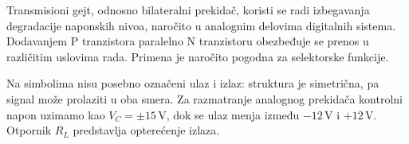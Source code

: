 Transmisioni gejt, odnosno bilateralni prekidač, koristi se radi izbegavanja degradacije naponskih nivoa, naročito u analognim delovima digitalnih sistema. Dodavanjem P tranzistora paralelno N tranzistoru obezbeđuje se prenos u različitim uslovima rada. Primena je naročito pogodna za selektorske funkcije.

Na simbolima nisu posebno označeni ulaz i izlaz: struktura je simetrična, pa signal može prolaziti u oba smera. Za razmatranje analognog prekidača kontrolni napon uzimamo kao $V_C=\pm15\,\mathrm V$, dok se ulaz menja između $-12\,\mathrm V$ i $+12\,\mathrm V$. Otpornik $R_L$ predstavlja opterećenje izlaza.
